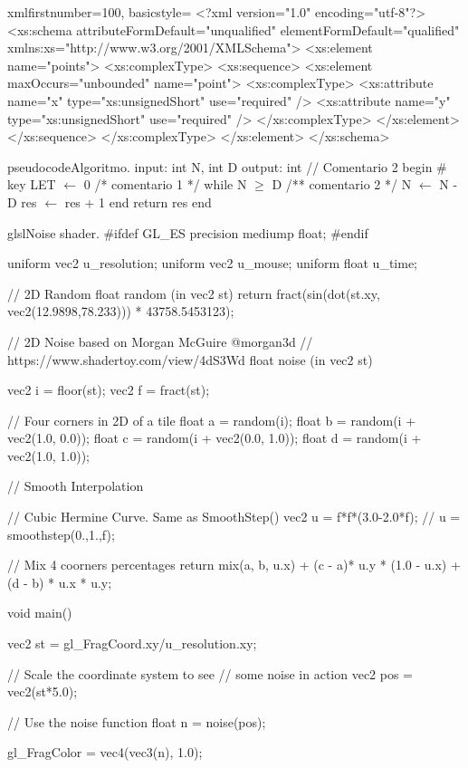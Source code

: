 \begin{sourcecodep}{xml}{firstnumber=100, basicstyle={\fontsize{7}{10}\selectfont\ttfamily}}{}
<?xml version="1.0" encoding="utf-8"?>
<xs:schema attributeFormDefault="unqualified" elementFormDefault="qualified"
   xmlns:xs="http://www.w3.org/2001/XMLSchema">
  <xs:element name="points">
    <xs:complexType>
      <xs:sequence>
        <xs:element maxOccurs="unbounded" name="point">
          <xs:complexType>
            <xs:attribute name="x" type="xs:unsignedShort" use="required" />
            <xs:attribute name="y" type="xs:unsignedShort" use="required" />
          </xs:complexType>
        </xs:element>
      </xs:sequence>
    </xs:complexType>
  </xs:element>
</xs:schema>
\end{sourcecodep}

\begin{sourcecode}{pseudocode}{Algoritmo.}
input: int N, int D %
output: int // Comentario 2
begin # key
	LET $\gets$ 0 /* comentario 1 */
	while N $\geq$ D /** comentario 2 */
		N $\gets$ N - D
		res $\gets$ res + 1      
	end
	return res
end    
\end{sourcecode}

\newpage
\begin{sourcecode}{glsl}{Noise shader.}
#ifdef GL_ES
precision mediump float;
#endif

uniform vec2 u_resolution;
uniform vec2 u_mouse;
uniform float u_time;

// 2D Random
float random (in vec2 st) {
	return fract(sin(dot(st.xy,
	vec2(12.9898,78.233)))
	* 43758.5453123);
}

// 2D Noise based on Morgan McGuire @morgan3d
// https://www.shadertoy.com/view/4dS3Wd
float noise (in vec2 st) {
	vec2 i = floor(st);
	vec2 f = fract(st);
	
	// Four corners in 2D of a tile
	float a = random(i);
	float b = random(i + vec2(1.0, 0.0));
	float c = random(i + vec2(0.0, 1.0));
	float d = random(i + vec2(1.0, 1.0));
	
	// Smooth Interpolation
	
	// Cubic Hermine Curve.  Same as SmoothStep()
	vec2 u = f*f*(3.0-2.0*f);
	// u = smoothstep(0.,1.,f);
	
	// Mix 4 coorners percentages
	return mix(a, b, u.x) +
	(c - a)* u.y * (1.0 - u.x) +
	(d - b) * u.x * u.y;
}

void main() {
	vec2 st = gl_FragCoord.xy/u_resolution.xy;
	
	// Scale the coordinate system to see
	// some noise in action
	vec2 pos = vec2(st*5.0);
	
	// Use the noise function
	float n = noise(pos);
	
	gl_FragColor = vec4(vec3(n), 1.0);
}
\end{sourcecode}

